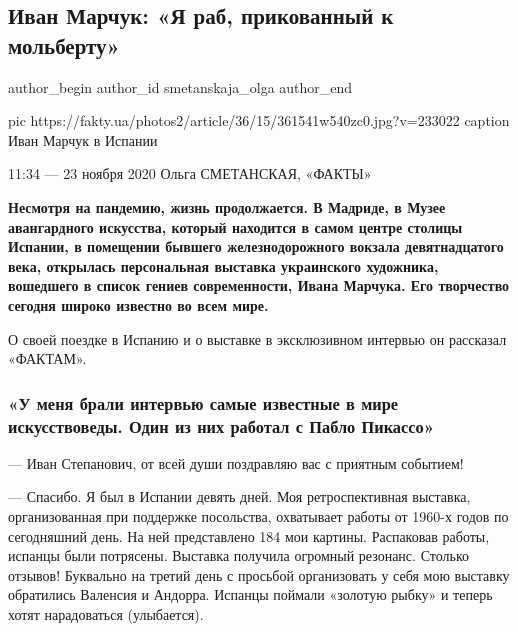  
 
 
 
 
 
\subsection{Иван Марчук: «Я раб, прикованный к мольберту»}
\label{sec:23_11_2020.news.ua.fakty.smetanskaja_olga.1.marchuk_rab_molbert}
\ifcmt
	author_begin
   author_id smetanskaja_olga
	author_end
\fi
{}

\ifcmt
	 pic https://fakty.ua/photos2/article/36/15/361541w540zc0.jpg?v=233022
	 caption Иван Марчук в Испании
\fi

11:34 — 23 ноября 2020
Ольга СМЕТАНСКАЯ, «ФАКТЫ»

\begin{leftbar}
	\bfseries
Несмотря на пандемию, жизнь продолжается. В Мадриде, в Музее авангардного
искусства, который находится в самом центре столицы Испании, в помещении
бывшего железнодорожного вокзала девятнадцатого века, открылась
персональная выставка украинского художника, вошедшего в список гениев
современности, Ивана Марчука. Его творчество сегодня широко известно
во всем мире.
\end{leftbar}

О своей поездке в Испанию и о выставке в эксклюзивном интервью
он рассказал «ФАКТАМ».

\subsubsection{«У меня брали интервью самые известные в мире искусствоведы. Один из них работал с Пабло Пикассо»}

— Иван Степанович, от всей души поздравляю вас с приятным событием!

— Спасибо. Я был в Испании девять дней. Моя ретроспективная выставка,
организованная при поддержке посольства, охватывает работы от 1960-х годов
по сегодняшний день. На ней представлено 184 мои картины. Распаковав
работы, испанцы были потрясены. Выставка получила огромный резонанс.
Столько отзывов! Буквально на третий день с просьбой организовать у себя
мою выставку обратились Валенсия и Андорра. Испанцы поймали «золотую
рыбку» и теперь хотят нарадоваться (улыбается).

